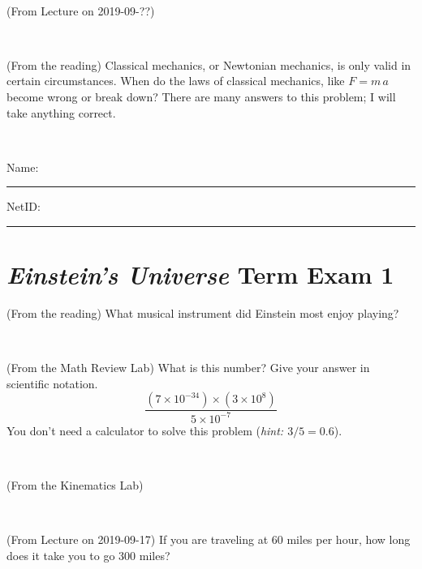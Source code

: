 \documentclass[12pt, letterpaper]{article}
\begin{document}
\vfill ~

\begin{problem} (From Lecture on 2019-09-??)
\end{problem}


\vfill ~

\begin{problem} (From the reading)
Classical mechanics, or Newtonian mechanics, is only valid in certain
circumstances. When do the laws of classical mechanics, like $F =
m\,a$ become wrong or break down? There are many answers to this
problem; I will take anything correct.
\end{problem}


\vfill ~


\cleardoublepage



\noindent
Name: \rule[-1ex]{0.60\textwidth}{0.1pt}
NetID: \rule[-1ex]{0.20\textwidth}{0.1pt}

\section*{\textsl{Einstein's Universe} Term Exam 1}
\setcounter{problem}{1}


\begin{problem} (From the reading)
What musical instrument did Einstein most enjoy playing?
\end{problem}


\vfill ~

\begin{problem} (From the Math Review Lab)
What is this number? Give your answer in scientific notation.
$$
\frac{(7\times10^{-34})\times(3\times10^8)}{5\times10^{-7}}
$$
You don't need a calculator to solve this problem (\textit{hint: $3/5=0.6$}).
\end{problem}


\vfill ~

\begin{problem} (From the Kinematics Lab)

\end{problem}


\vfill ~

\begin{problem} (From Lecture on 2019-09-17)
If you are traveling at 60 miles per hour, how long does
it take you to go 300 miles?
\end{problem}


\vfill ~


\clearpage
\end{document}
